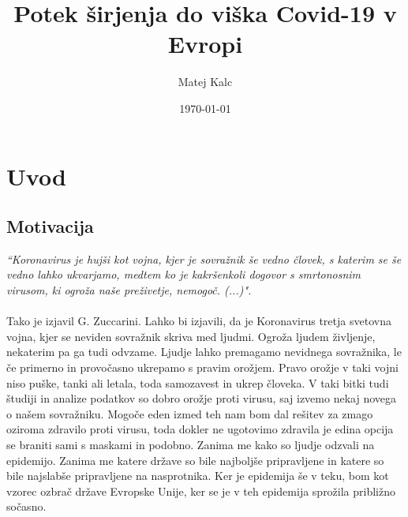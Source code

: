 \documentclass[a4paper,11pt]{article}
\title{Potek širjenja do viška Covid-19 v Evropi}
\author{Matej Kalc} %
\date{\today}
\begin{document}
\maketitle

\section{Uvod}
\subsection{Motivacija}


\emph{“Koronavirus je hujši kot vojna, kjer je sovražnik še vedno človek, s katerim se še
vedno lahko ukvarjamo, medtem ko je kakršenkoli dogovor s smrtonosnim virusom,
ki ogroža naše preživetje, nemogoč. (...)".} \\ \\
Tako je izjavil G. Zuccarini. Lahko bi izjavili, da je Koronavirus tretja svetovna vojna, kjer se neviden sovražnik skriva med ljudmi. Ogroža ljudem življenje, nekaterim pa ga tudi odvzame. Ljudje lahko premagamo nevidnega sovražnika, le če primerno in provočasno ukrepamo s pravim orožjem. Pravo orožje v taki vojni niso puške, tanki ali letala, toda samozavest in ukrep človeka. V taki bitki tudi študiji in analize podatkov so dobro orožje proti virusu, saj izvemo nekaj novega o našem sovražniku. Mogoče eden izmed teh nam bom dal rešitev za zmago oziroma zdravilo proti virusu, toda dokler ne ugotovimo zdravila je edina opcija se braniti sami s maskami in podobno. Zanima me kako so ljudje odzvali na epidemijo. Zanima me katere države so bile najboljše pripravljene in katere so bile najslabše pripravljene na nasprotnika. Ker je epidemija še v teku, bom kot vzorec ozbrač države Evropske Unije, ker se je v teh epidemija sprožila približno sočasno. 
\end{document}
